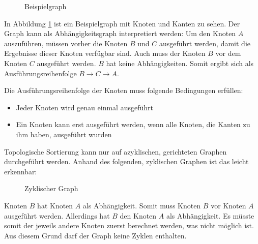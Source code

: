 \begin{figure}[H]
    \centering
    \caption{Beispielgraph}
    \label{fig:nodeExecutionOrder1}
\end{figure}

In Abbildung \ref{fig:nodeExecutionOrder1} ist ein Beispielgraph mit Knoten und Kanten zu sehen. Der Graph kann als Abhängigkeitsgraph interpretiert werden: Um den Knoten $A$ auszuführen, müssen vorher die Knoten $B$ und $C$ ausgeführt werden, damit die Ergebnisse dieser Knoten verfügbar sind. Auch muss der Knoten $B$ vor dem Knoten $C$ ausgeführt werden. $B$ hat keine Abhängigkeiten. Somit ergibt sich als Ausführungsreihenfolge $B \rightarrow C \rightarrow A$.

Die Ausführungsreihenfolge der Knoten muss folgende Bedingungen erfüllen:
\begin{itemize}
    \item Jeder Knoten wird genau einmal ausgeführt
    \item Ein Knoten kann erst ausgeführt werden, wenn alle Knoten, die Kanten zu ihm haben, ausgeführt wurden
\end{itemize}


Topologische Sortierung kann nur auf azyklischen, gerichteten Graphen durchgeführt werden. Anhand des folgenden, zyklischen Graphen ist das leicht erkennbar:
\begin{figure}[H]
    \centering
    \caption{Zyklischer Graph}
    \label{fig:cyclicGraph}
\end{figure}
Knoten $B$ hat Knoten $A$ als Abhängigkeit. Somit muss Knoten $B$ vor Knoten $A$ ausgeführt werden. Allerdings hat $B$ den Knoten $A$ als Abhängigkeit. Es müsste somit der jeweils andere Knoten zuerst berechnet werden, was nicht möglich ist. Aus diesem Grund darf der Graph keine Zyklen enthalten.

